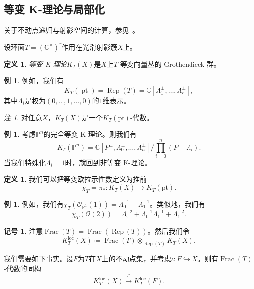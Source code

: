 \documentclass{amsart}
\theoremstyle{definition}
\newtheorem{defn}[thm]{定义}
\newtheorem{exm}[thm]{例}
\newtheorem{notn}[thm]{记号}
\theoremstyle{remark}
\newtheorem{rmk}[thm]{注}
\theoremstyle{plain}
\theoremstyle{definition}
\theoremstyle{remark}
\newcommand{\C}{\mathbb{C}}
\renewcommand{\P}{\mathbb{P}}
\newcommand{\mc}[1]{\mathcal{#1}}
\newcommand{\mr}[1]{\mathrm{#1}}
\newcommand{\on}[1]{\operatorname{#1}}
\newcommand{\1}{\mathbf{1}}
\newcommand{\2}{\mathbf{2}}
\newcommand{\3}{\mathbf{3}}
\newcommand{\loc}{\mr{loc}}
\begin{document}
\subsection{等变 K-理论与局部化}%
\label{sub:Equivariant K-theory and localization}

关于不动点递归与射影空间的计算，参见~\cite{GiventalK2}。

设环面\(T = (\C^{\times})^r\)作用在光滑射影簇\(X\)上。

\begin{defn}
    \textit{等变 K-理论}\(K_T(X)\)是\(X\)上\(T\)-等变向量丛的 Grothendieck 群。
\end{defn}

\begin{exm}
    例如，我们有
    \[ K_T(\on{pt}) = \on{Rep}(T) = \C[\Lambda_1^{\pm}, \ldots, \Lambda_r^{\pm}], \]
    其中\(\Lambda_i\)是权为\((0, \ldots, 1, \ldots, 0)\)的\(1\)维表示。
\end{exm}

\begin{rmk}
    对任意\(X\)，\(K_T(X)\)是一个\(K_T(\mr{pt})\)-代数。
\end{rmk}

\begin{exm}
    考虑\(\P^n\)的完全等变 K-理论。则我们有
    \[ K_T(\P^n) = \C[P^{\pm}, \Lambda_0^{\pm}, \ldots, \Lambda_n^{\pm}] \big/ \prod_{i=0}^n (P-\Lambda_i). \]
    当我们特殊化\(\Lambda_i = 1\)时，就回到非等变 K-理论。
\end{exm}

\begin{defn}
    我们可以把等变欧拉示性数定义为推前
    \[ \chi_T = \pi_* \colon K_T(X) \to K_T(\mr{pt}). \]
\end{defn}

\begin{exm}
    例如，我们有\(\chi_T(\mc{O}_{\P^1}(1)) = \Lambda_0^{-1} + \Lambda_1^{-1}\)。类似地，我们有
    \[ \chi_T(\mc{O}(2)) = \Lambda_0^{-2} + \Lambda_0^{-1} \Lambda_1^{-1} + \Lambda_1^{-2}. \]
\end{exm}

\begin{notn}
    注意\(\on{Frac}(T) = \on{Frac}(\on{Rep}(T))\)。然后我们令
    \[ K_T^{\loc}(X) \coloneqq \on{Frac}(T) \otimes_{\on{Rep}(T)} K_T(X). \]
\end{notn}

我们需要如下事实。设\(F\)为\(T\)在\(X\)上的不动点集，并考虑\(\iota \colon F \hookrightarrow X\)。则有\(\on{Frac}(T)\)-代数的同构
\[ K_T^{\loc}(X) \xrightarrow{\iota^*} K_T^{\loc}(F). \]
\end{document}
